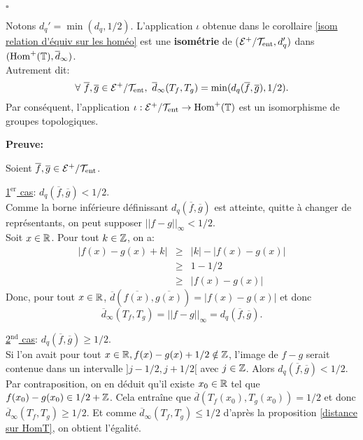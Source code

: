 	 \hfill $\square$\\






\begin{proposition}
	Notons $d_q'=\min(d_q,1/2)$. L'application $\iota$ obtenue dans le corollaire \ref{isom relation d'équiv sur les homéo} est une \textbf{isométrie} de (${\mathcal{E}}^+/\mathcal{T}_{\mathrm{ent}}, d_q')$ dans $(\mathrm{Hom}^+({\mathbb{T}}),\overline{d}_\infty)$.\\
	Autrement dit:
	$$\forall\ \overline{f}, \overline{g} \in \EnsembleQuotient{\Ec^+}{\Tent},\ \overline{d}_\infty(T_f,T_g)=\min(d_q(\overline{f},\overline{g}), 1/2).$$
	Par conséquent, l'application $\iota:{\mathcal{E}}^+/\mathcal{T}_{\mathrm{ent}}\to \mathrm{Hom}^+({\mathbb{T}})$ est un isomorphisme de groupes topologiques.
\end{proposition}

	\textbf{Preuve:}
	\par Soient $\overline{f}, \overline{g} \in {\mathcal{E}}^+/\mathcal{T}_{\mathrm{ent}}$.

	\par \underline{1$^{\mathrm{er}}$ cas}: $d_q(\overline{f},\overline{g})<1/2$.\\
	 Comme la borne inférieure définissant $d_q(\overline{f},\overline{g})$ est atteinte, quitte à changer de représentants, on peut supposer $||f-g||_\infty<1/2$.\\
	Soit $x \in {\mathbb{R}}$. Pour tout $k \in {\mathbb{Z}}$, on a:
	\begin{eqnarray*}
		|f(x)-g(x)+k|&\geq&|k|-|f(x)-g(x)|\\
			&\geq&1-1/2\\
			&\geq&|f(x)-g(x)|
	\end{eqnarray*}
	Donc, pour tout $x \in {\mathbb{R}}$, $\overline{d}(\overline{f(x)},\overline{g(x)})=|f(x)-g(x)|$ et donc $$\overline{d}_\infty(T_f,T_g)=||f-g||_\infty=d_q(\overline{f},\overline{g}).$$

	\par \underline{2$^{\mathrm{nd}}$ cas}: $d_q(\overline{f},\overline{g})\geq1/2$.\\
	Si l'on avait pour tout $x \in {\mathbb{R}}, f(x)-g(x)+1/2 \notin {\mathbb{Z}}$, l'image de $f-g$ serait contenue dans un intervalle $]j-1/2,j+1/2[$ avec $j \in {\mathbb{Z}}$. Alors $d_q(\overline{f},\overline{g})<1/2$.\\
	Par contraposition, on en déduit qu'il existe $x_0 \in {\mathbb{R}}$ tel que $f(x_0)-g(x_0) \in 1/2 +{\mathbb{Z}}$. Cela entraîne que $\overline{d}(T_f(x_0),T_g(x_0)) =1/2$ et donc $\overline{d}_\infty(T_f,T_g)\geq1/2$. Et comme $\overline{d}_\infty(T_f,T_g)\leq 1/2$ d'après la proposition \ref{distance sur HomT}, on obtient l'égalité.\\

